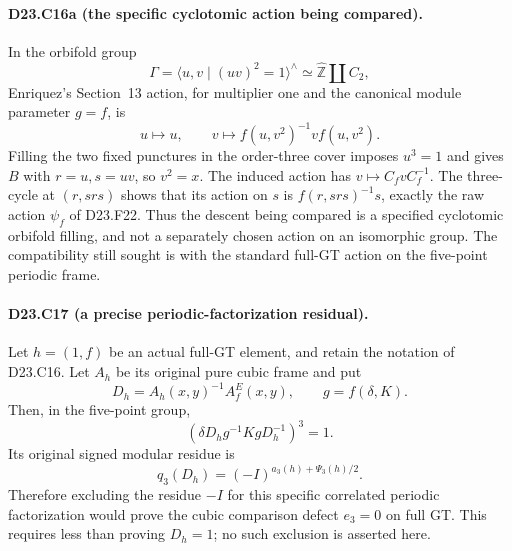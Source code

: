 \paragraph{D23.C16a (the specific cyclotomic action being compared).}
In the orbifold group
\[
 \Gamma=\langle u,v\mid(uv)^2=1\rangle^{\wedge}
           \simeq\widehat{\mathbb Z}\amalg C_2,
\]
Enriquez's Section~13 action, for multiplier one and the canonical
module parameter $g=f$, is
\[
 u\longmapsto u,\qquad
 v\longmapsto f(u,v^2)^{-1}v f(u,v^2).
\]
Filling the two fixed punctures in the order-three cover imposes
$u^3=1$ and gives $B$ with $r=u,s=uv$, so $v^2=x$.
The induced action has $v\mapsto C_fvC_f^{-1}$.
The three-cycle at $(r,srs)$ shows that its action on $s$ is
$f(r,srs)^{-1}s$, exactly the raw action $\psi_f$ of D23.F22.
Thus the descent being compared is a specified cyclotomic orbifold
filling, and not a separately chosen action on an isomorphic group.
The compatibility still sought is with the standard full-GT action
on the five-point periodic frame.

\paragraph{D23.C17 (a precise periodic-factorization residual).}
Let $h=(1,f)$ be an actual full-GT element, and retain the notation
of D23.C16. Let $A_h$ be its original pure cubic frame and put
\[
 D_h=A_h(x,y)^{-1}A^E_f(x,y),\qquad
                g=f(\delta,K).
\]
Then, in the five-point group,
\[
             \boxed{\ (\delta D_hg^{-1}KgD_h^{-1})^3=1.\ }
\tag{D23.C17.1}
\]
Its original signed modular residue is
\[
                  q_3(D_h)=(-I)^{a_3(h)+\Psi_3(h)/2}.
\tag{D23.C17.2}
\]
Therefore excluding the residue $-I$ for this specific correlated
periodic factorization would prove the cubic comparison defect
$e_3=0$ on full GT. This requires less than proving $D_h=1$;
no such exclusion is asserted here.

